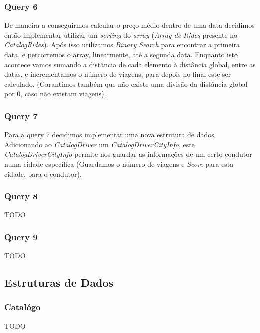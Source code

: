 \documentclass{article}
\begin{document}
        \subsubsection{Query 6}
            De maneira a conseguirmos calcular o preço médio dentro de uma data decidimos 
            então implementar utilizar um \emph{sorting} do \emph{array} (\emph{Array de Rides}
            presente no \emph{CatalogRides}). Após isso utilizamos \emph{Binary Search} para
            encontrar a primeira data, e percorremos o array, linearmente, até a segunda data.
            Enquanto isto acontece vamos sumando a distância de cada elemento à distância global,
            entre as datas, e incrementamos o número de viagens, para depois no final este ser 
            calculado. (Garantimos também que não existe uma divisão da distância global por 0, 
            caso não existam viagens).
        \subsubsection{Query 7}
            Para a query 7 decidimos implementar uma nova estrutura de dados. Adicionando ao 
            \emph{CatalogDriver} um \emph{CatalogDriverCityInfo}, este \emph{CatalogDriverCityInfo} 
            permite nos guardar as informações de um certo condutor numa cidade específica 
            (Guardamos o número de viagens e \emph{Score} para esta cidade, para o condutor). 
        \subsubsection{Query 8}
            TODO
        \subsubsection{Query 9}
            TODO
    \subsection{Estruturas de Dados}
        \subsubsection{Catalógo}
            TODO
\end{document}
